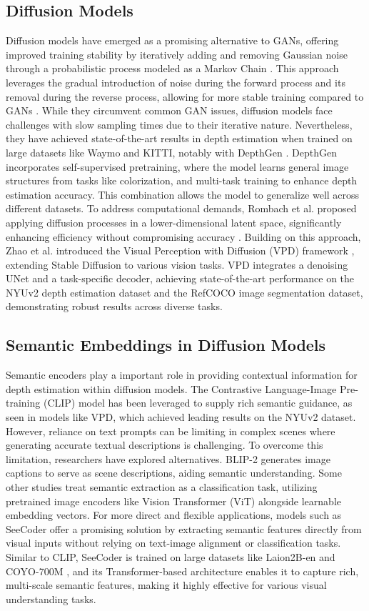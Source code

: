 \subsection{Diffusion Models}
Diffusion models have emerged as a promising alternative to GANs, offering improved training stability by iteratively adding and removing Gaussian noise through a probabilistic process modeled as a Markov Chain \cite{c12}. This approach leverages the gradual introduction of noise during the forward process and its removal during the reverse process, allowing for more stable training compared to GANs \cite{c7}. While they circumvent common GAN issues, diffusion models face challenges with slow sampling times due to their iterative nature. Nevertheless, they have achieved state-of-the-art results in depth estimation when trained on large datasets like Waymo and KITTI, notably with DepthGen \cite{c8}. DepthGen incorporates self-supervised pretraining, where the model learns general image structures from tasks like colorization, and multi-task training to enhance depth estimation accuracy. This combination allows the model to generalize well across different datasets. To address computational demands, Rombach et al. proposed applying diffusion processes in a lower-dimensional latent space, significantly enhancing efficiency without compromising accuracy \cite{c13}. Building on this approach, Zhao et al. introduced the Visual Perception with Diffusion (VPD) framework \cite{c14}, extending Stable Diffusion to various vision tasks. VPD integrates a denoising UNet and a task-specific decoder, achieving state-of-the-art performance on the NYUv2 depth estimation dataset and the RefCOCO image segmentation dataset, demonstrating robust results across diverse tasks.


\subsection{Semantic Embeddings in Diffusion Models}
Semantic encoders play a important role in providing contextual information for depth estimation within diffusion models. The Contrastive Language-Image Pre-training (CLIP) model \cite{c15} has been leveraged to supply rich semantic guidance, as seen in models like VPD, which achieved leading results on the NYUv2 dataset. However, reliance on text prompts can be limiting in complex scenes where generating accurate textual descriptions is challenging. To overcome this limitation, researchers have explored alternatives. BLIP-2 \cite{c24} generates image captions to serve as scene descriptions, aiding semantic understanding. Some other studies treat semantic extraction as a classification task, utilizing pretrained image encoders like Vision Transformer (ViT) \cite{c25} alongside learnable embedding vectors. For more direct and flexible applications, models such as SeeCoder offer a promising solution by extracting semantic features directly from visual inputs without relying on text-image alignment or classification tasks. Similar to CLIP, SeeCoder is trained on large datasets like Laion2B-en \cite{c26} and COYO-700M \cite{c27}, and its Transformer-based architecture enables it to capture rich, multi-scale semantic features, making it highly effective for various visual understanding tasks.


